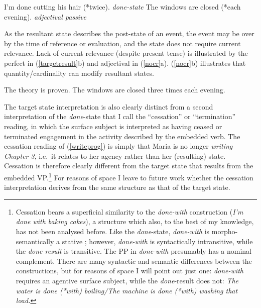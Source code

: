 \documentclass[output=paper,modfonts,nonflat]{langsci/langscibook}
\begin{document}
\begin{exe}
\ex\label{resst}
\begin{xlist}
\ex I'm done cutting his hair (*twice).  \hfill \emph{done-state}
\ex The windows are closed (*each evening). \hfill \emph{adjectival passive}
\end{xlist}
\end{exe}

As the resultant state describes the post-state of an event, the event may be over by the time of reference or evaluation, and the state does not require current relevance. Lack of current relevance (despite present tense) is illustrated by the perfect in (\ref{targetresult}b) and adjectival  in (\ref{nocr}a). (\ref{nocr}b) illustrates that quantity/cardinality  can modify resultant states.

\begin{exe}
\ex\label{nocr}
\begin{xlist}
\ex The theory is proven.
\ex The windows are closed three times each evening.
\end{xlist}
\end{exe}

The target state interpretation is also clearly distinct from a second
interpretation of the \emph{done}-state that I call the \enquote{cessation} or
\enquote{termination} reading, in which the surface subject is interpreted as
having ceased or terminated engagement in the activity described by the
embedded verb. The cessation reading of (\ref{writeprog}) is simply that Maria
is no longer \emph{writing Chapter 3}, i.e.\ it relates to her agency rather
than her (resulting) state. Cessation is therefore clearly different from the
target state that results from the embedded VP\@.\footnote{Cessation bears a
    superficial similarity to the {\em done-with} construction (\emph{I'm
    done with baking cakes}), a structure which also, to the best of my
    knowledge, has not been analysed before. Like the \emph{done}-state, {\em
    done-with} is morpho-semantically a stative ; however, {\em
done-with} is syntactically intransitive, while the \emph{done result} is
transitive. The PP in {\em done-with} presumably has a nominal complement.
There are many syntactic and semantic differences between the constructions,
but for reasons of space I will point out just one: {\em done-with} requires an
agentive surface subject, while the {\em done}-result does not: \emph{The water
is done (*with) boiling\slash The machine is done (*with) washing that load.}} For
reasons of space I leave to future work whether the cessation interpretation
derives from the same structure as that of the target state.
\end{document}
